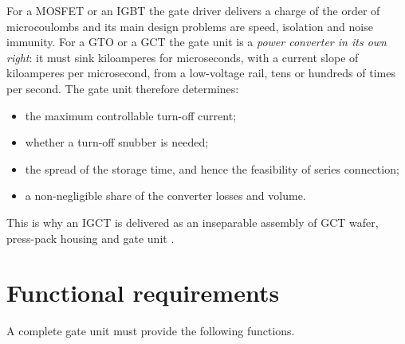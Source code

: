 \documentclass[11pt,a4paper]{report}
\begin{document}
For a MOSFET or an IGBT the gate driver delivers a charge of the order of
microcoulombs and its main design problems are speed, isolation and noise
immunity. For a GTO or a GCT the gate unit is a \emph{power converter in its own
right}: it must sink kiloamperes for microseconds, with a current slope of
kiloamperes per microsecond, from a low-voltage rail, tens or hundreds of times
per second. The gate unit therefore determines:

\begin{itemize}[nosep]
  \item the maximum controllable turn-off current;
  \item whether a turn-off snubber is needed;
  \item the spread of the storage time, and hence the feasibility of series
        connection;
  \item a non-negligible share of the converter losses and volume.
\end{itemize}

This is why an IGCT is delivered as an inseparable assembly of GCT wafer,
press-pack housing and gate unit \cite{carroll1997igct,abb5sya2032}.

\section{Functional requirements}

A complete gate unit must provide the following functions.
\end{document}
